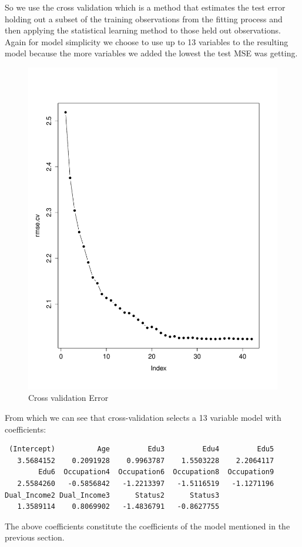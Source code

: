 \documentclass[11pt]{article}
\begin{document}
So we use the cross validation which is a method that estimates the test error holding out a subset  of the training observations from the fitting process and then applying the statistical learning method to those held out observations. Again for model simplicity we choose to use up to 13 variables to the resulting model because the more variables we added the lowest the test MSE was getting.

\begin{figure}[h]
    \centering
   \includegraphics[scale=0.3]{CROSS_VALIDATION_MSE_PLOT.pdf}
    \caption{Cross validation Error}
    \label{fig:Cross validation Error}
\end{figure}

From which we can see that cross-validation selects a 13 variable model with coefficients:
\begin{verbatim}
 (Intercept)          Age         Edu3         Edu4         Edu5 
   3.5684152    0.2091928    0.9963787    1.5503228    2.2064117 
        Edu6  Occupation4  Occupation6  Occupation8  Occupation9 
   2.5584260   -0.5856842   -1.2213397   -1.5116519   -1.1271196 
Dual_Income2 Dual_Income3      Status2      Status3 
   1.3589114    0.8069902   -1.4836791   -0.8627755 
 \end{verbatim}
The above coefficients constitute the coefficients of the model mentioned in the previous section.
\end{document}
